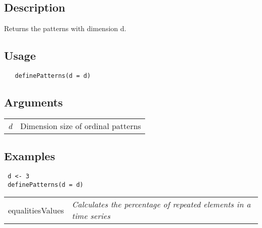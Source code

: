 \documentclass[12pt,letterpaper]{article}
\begin{document}
\vspace{0.5cm}

\subsection*{Description}

Returns the patterns with dimension d.

\vspace{0.5cm}

\subsection*{Usage}

\begin{lstlisting}
   definePatterns(d = d)
\end{lstlisting}

\vspace{0.5cm}

\subsection*{Arguments}

\begin{table}[!ht]
\begin{center}
\begin{tabularx}{\textwidth}{X X}
\hspace{0.5cm} \textit{d} & Dimension size of ordinal patterns\\
\end{tabularx}
\end{center}
\end{table} 

\subsection*{Examples}

\begin{lstlisting}
 d <- 3
 definePatterns(d = d)
\end{lstlisting}

\vspace{0.5cm}

\newpage


\hrulefill   

\begin{table}[!ht]
\begin{center}
\begin{tabularx}{\textwidth}{ X X}
\hspace{0.5cm} equalitiesValues & \textit{Calculates the percentage of repeated elements in a time series}\\
\end{tabularx}
\end{center}
\end{table} 
\end{document}
